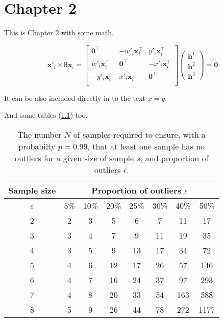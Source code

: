 \chapter{Chapter 2}

This is Chapter 2 with some math.

\begin{equation}
\label{eq:some_equation}
\mathbf{x'}_i \times \texttt{H}\mathbf{x}_i = 
\begin{bmatrix}
\mathbf{0}^{\top} & -w'_i\mathbf{x}_i^{\top} & y'_i\mathbf{x}_i^{\top} \\
w'_i\mathbf{x}_i^{\top} & \mathbf{0}^{\top} & -x'_i\mathbf{x}_i^{\top} \\
-y'_i\mathbf{x}_i^{\top} & x'_i\mathbf{x}_i^{\top} & \mathbf{0}^{\top} \\
\end{bmatrix}
\begin{pmatrix}
\mathbf{h}^{1} \\ 
\mathbf{h}^{2} \\ 
\mathbf{h}^{3}
\end{pmatrix}
= \mathbf{0}
\end{equation}

It can be also included directly in to the text $x = y$.

And some tables (\ref{tab:some_table}) too.

\begin{table}[!h]
\begin{center}
\begin{tabular}{c c c c c c c c}
\toprule
Sample size & \multicolumn{7}{c}{Proportion of outliers $\epsilon$}\\
\midrule
s & 5\% & 10\% & 20\% & 25\% & 30\% & 40\% & 50\% \\
\midrule
2 & 2 & 3 & 5 & 6 & 7 & 11 & 17 \\
3 & 3 & 4 & 7 & 9 & 11 & 19 & 35 \\
4 & 3 & 5 & 9 & 13 & 17 & 34 & 72 \\
5 & 4 & 6 & 12 & 17 & 26 & 57 & 146 \\
6 & 4 & 7 & 16 & 24 & 37 & 97 & 293 \\
7 & 4 & 8 & 20 & 33 & 54 & 163 & 588 \\
8 & 5 & 9 & 26 & 44 & 78 & 272 & 1177 \\
\bottomrule
\end{tabular}
\end{center}
\caption[Required samples for RANSAC]{The number $N$ of samples required to ensure, with a probabilty $p = 0.99$, that at least one sample has no outliers for a given size of sample $s$, and proportion of outliers $\epsilon$.}
\label{tab:some_table}
\end{table}